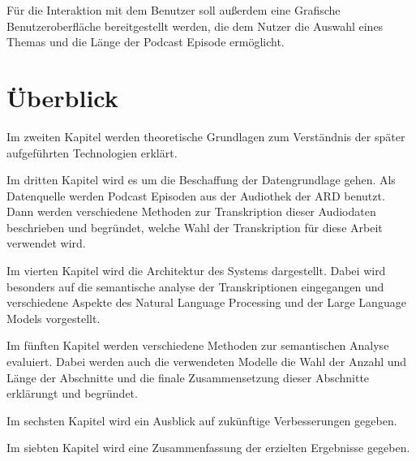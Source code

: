 Für die Interaktion mit dem Benutzer soll außerdem eine Grafische Benutzeroberfläche bereitgestellt werden, die dem Nutzer die Auswahl eines Themas und die Länge der Podcast  Episode ermöglicht.

\section{Überblick}

Im zweiten Kapitel werden theoretische Grundlagen zum Verständnis der später aufgeführten Technologien erklärt.

Im dritten Kapitel wird es um die Beschaffung der Datengrundlage gehen. Als Datenquelle werden Podcast Episoden aus der Audiothek der ARD benutzt. 
Dann werden verschiedene Methoden zur Transkription dieser Audiodaten beschrieben und begründet, welche Wahl der Transkription für diese Arbeit verwendet wird.

Im vierten Kapitel wird die Architektur des Systems dargestellt. 
Dabei wird besonders auf die semantische analyse der Transkriptionen eingegangen und verschiedene Aspekte des Natural Language Processing und der Large Language Models vorgestellt.

Im fünften Kapitel werden verschiedene Methoden zur semantischen Analyse evaluiert.
Dabei werden auch die verwendeten Modelle die Wahl der Anzahl und Länge der Abschnitte und die finale Zusammensetzung dieser Abschnitte erklärungt und begründet.

Im sechsten Kapitel wird ein Ausblick auf zukünftige Verbesserungen gegeben.

Im siebten Kapitel wird eine Zusammenfassung der erzielten Ergebnisse gegeben.
